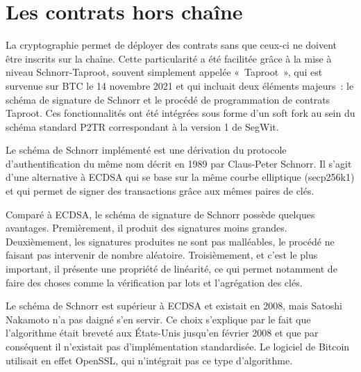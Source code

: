 \section*{Les contrats hors chaîne} %

La cryptographie permet de déployer des contrats sans que ceux-ci ne doivent être inscrits sur la chaîne. Cette particularité a été facilitée grâce à la mise à niveau Schnorr-Taproot, souvent simplement appelée «~Taproot~», qui est survenue sur BTC le 14 novembre 2021 et qui incluait deux éléments majeurs~: le schéma de signature de Schnorr et le procédé de programmation de contrats Taproot. Ces fonctionnalités ont été intégrées sous forme d'un soft fork au sein du schéma standard P2TR correspondant à la version 1 de SegWit.

Le schéma de Schnorr implémenté est une dérivation du protocole d'authentification du même nom décrit en 1989 par Claus-Peter Schnorr. Il s'agit d'une alternative à ECDSA qui se base sur la même courbe elliptique (secp256\-k1) et qui permet de signer des transactions grâce aux mêmes paires de clés.

Comparé à ECDSA, le schéma de signature de Schnorr possède quelques avantages. Premièrement, il produit des signatures moins grandes. Deuxièmement, les signatures produites ne sont pas malléables, le procédé ne faisant pas intervenir de nombre aléatoire. Troisièmement, et c'est le plus important, il présente une propriété de linéarité, ce qui permet notamment de faire des choses comme la vérification par lots et l'agrégation des clés.

Le schéma de Schnorr est supérieur à ECDSA et existait en 2008, mais Satoshi Nakamoto n'a pas daigné s'en servir. Ce choix s'explique par le fait que l'algorithme était breveté aux États-Unis jusqu'en février 2008 et que par conséquent il n'existait pas d'implémentation standardisée. Le logiciel de Bitcoin utilisait en effet OpenSSL, qui n'intégrait pas ce type d'algorithme.

